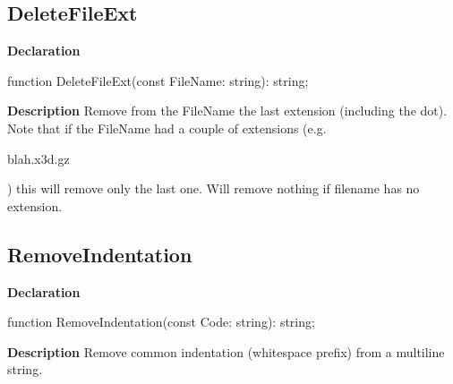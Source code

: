 \documentclass{report}
\newif\ifpdf
\begin{document}
\subsection*{DeleteFileExt}
\fi
\label{PasDoc_Utils-DeleteFileExt}
\begin{list}{}{
\setlength{\itemindent}{0cm}
\setlength{\listparindent}{0cm}
\setlength{\leftmargin}{\evensidemargin}
\addtolength{\leftmargin}{\tmplength}
\settowidth{\labelsep}{X}
\addtolength{\leftmargin}{\labelsep}
\setlength{\labelwidth}{\tmplength}
}
\item[\textbf{Declaration}\hfill]
\ifpdf
\begin{flushleft}
\fi
\begin{ttfamily}
function DeleteFileExt(const FileName: string): string;\end{ttfamily}

\ifpdf
\end{flushleft}
\fi

\par
\item[\textbf{Description}]
Remove from the FileName the last extension (including the dot). Note that if the FileName had a couple of extensions (e.g. \begin{ttfamily}blah.x3d.gz\end{ttfamily}) this will remove only the last one. Will remove nothing if filename has no extension.

\end{list}
\ifpdf
\subsection*{\large{\textbf{RemoveIndentation}}\normalsize\hspace{1ex}\hrulefill}
\else
\subsection*{RemoveIndentation}
\fi
\label{PasDoc_Utils-RemoveIndentation}
\begin{list}{}{
\setlength{\itemindent}{0cm}
\setlength{\listparindent}{0cm}
\setlength{\leftmargin}{\evensidemargin}
\addtolength{\leftmargin}{\tmplength}
\settowidth{\labelsep}{X}
\addtolength{\leftmargin}{\labelsep}
\setlength{\labelwidth}{\tmplength}
}
\item[\textbf{Declaration}\hfill]
\ifpdf
\begin{flushleft}
\fi
\begin{ttfamily}
function RemoveIndentation(const Code: string): string;\end{ttfamily}

\ifpdf
\end{flushleft}
\fi

\par
\item[\textbf{Description}]
Remove common indentation (whitespace prefix) from a multiline string.

\end{list}
\ifpdf
\end{document}
